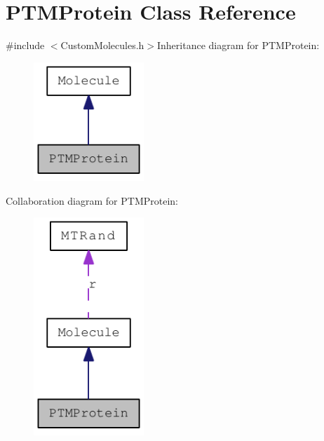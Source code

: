 \hypertarget{classPTMProtein}{
\section{PTMProtein Class Reference}
\label{classPTMProtein}
}


{\ttfamily \#include $<$CustomMolecules.h$>$}Inheritance diagram for PTMProtein:\nopagebreak
\begin{figure}[H]
\begin{center}
\leavevmode
\includegraphics[width=118pt]{classPTMProtein__inherit__graph}
\end{center}
\end{figure}
Collaboration diagram for PTMProtein:\nopagebreak
\begin{figure}[H]
\begin{center}
\leavevmode
\includegraphics[width=118pt]{classPTMProtein__coll__graph}
\end{center}
\end{figure}
